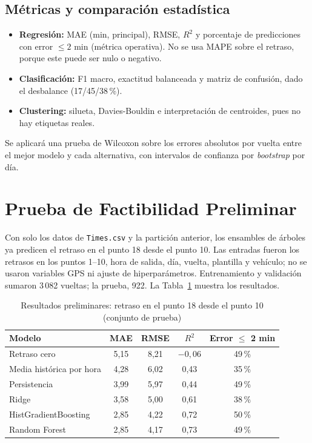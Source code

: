 \documentclass[conference,spanish]{IEEEtran}
\begin{document}
\subsection{Métricas y comparación estadística}
\begin{itemize}
    \item \textbf{Regresión:} MAE (min, principal), RMSE, $R^2$ y porcentaje de predicciones con error $\le2$ min (métrica operativa). No se usa MAPE sobre el retraso, porque este puede ser nulo o negativo.
    \item \textbf{Clasificación:} F1 macro, exactitud balanceada y matriz de confusión, dado el desbalance (17/45/38\,\%).
    \item \textbf{Clustering:} silueta, Davies-Bouldin e interpretación de centroides, pues no hay etiquetas reales.
\end{itemize}
Se aplicará una prueba de Wilcoxon sobre los errores absolutos por vuelta entre el mejor modelo y cada alternativa, con intervalos de confianza por \textit{bootstrap} por día.

\section{Prueba de Factibilidad Preliminar}

Con solo los datos de \texttt{Times.csv} y la partición anterior, los ensambles de árboles ya predicen el retraso en el punto 18 desde el punto 10. Las entradas fueron los retrasos en los puntos 1--10, hora de salida, día, vuelta, plantilla y vehículo; no se usaron variables GPS ni ajuste de hiperparámetros. Entrenamiento y validación sumaron 3\,082 vueltas; la prueba, 922. La Tabla~\ref{tab:prelim} muestra los resultados.

\begin{table}[h]
\centering
\caption{Resultados preliminares: retraso en el punto 18 desde el punto 10 (conjunto de prueba)}
\label{tab:prelim}
\footnotesize
\begin{tabular}{@{}lcccc@{}}
\toprule
\textbf{Modelo} & \textbf{MAE} & \textbf{RMSE} & \textbf{$R^2$} & \textbf{Error $\le$ 2 min}\\
\midrule
Retraso cero & 5,15 & 8,21 & $-0{,}06$ & 49\,\%\\
Media histórica por hora & 4,28 & 6,02 & 0,43 & 35\,\%\\
Persistencia & 3,99 & 5,97 & 0,44 & 49\,\%\\
Ridge & 3,58 & 5,00 & 0,61 & 38\,\%\\
HistGradientBoosting & 2,85 & 4,22 & 0,72 & 50\,\%\\
Random Forest & 2,85 & 4,17 & 0,73 & 49\,\%\\
\bottomrule
\end{tabular}
\end{table}
\end{document}
